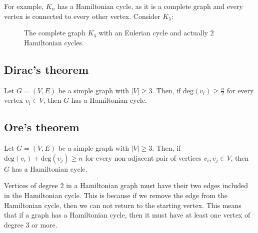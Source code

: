 \documentclass[11pt]{article}
\begin{document}
For example, $K_n$ has a Hamiltonian cycle, as it is a complete graph and every vertex is connected to every other vertex. Consider $K_5$:
\begin{figure}[H]
    \centering
    \caption{The complete graph $K_5$ with an Eulerian cycle and actually 2 Hamiltonian cycles.}
    \label{fig:graph_k5}
\end{figure}

\subsection{Dirac's theorem}
Let $G = (V,E)$ be a simple graph with $|V| \geq 3$. Then, if $\text{deg}(v_i) \geq \frac{n}{2}$ for every vertex $v_i \in V$, then $G$ has a Hamiltonian cycle.

\subsection{Ore's theorem}
Let $G = (V,E)$ be a simple graph with $|V| \geq 3$. Then, if $\text{deg}(v_i) + \text{deg}(v_j) \geq n$ for every non-adjacent pair of vertices $v_i, v_j \in V$, then $G$ has a Hamiltonian cycle.

Vertices of degree 2 in a Hamiltonian graph must have their two edges included in the Hamiltonian cycle. This is because if we remove the edge from the Hamiltonian cycle, then we can not return to the starting vertex. This means that if a graph has a Hamiltonian cycle, then it must have at least one vertex of degree 3 or more.
\end{document}
